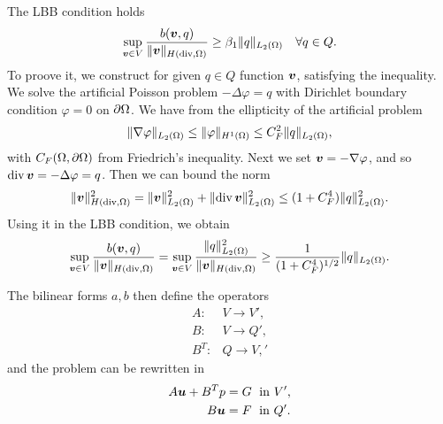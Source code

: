 The LBB condition holds
\begin{equation}
    \sup_{\mathbf{\boldsymbol{v}}\in V} \frac{b(\mathbf{\boldsymbol{v}},q)}{\| \mathbf{\boldsymbol{v}} \|_{H({\rm div},\Omega)}} \geq \beta_1\| q \|_{L_2(\Omega)} \quad \forall q\in Q.
\end{equation}
To proove it, we construct for given $q\in Q$ function $\mathbf{\boldsymbol{v}}$, satisfying the inequality.
We solve the artificial Poisson problem $-\Delta\varphi = q$ with Dirichlet boundary condition $\varphi = 0$ on $\partial\Omega$. We have from the ellipticity of the artificial problem
\begin{equation}
    \| \nabla\varphi \|_{L_2(\Omega)} \leq \| \varphi \|_{H^1(\Omega)}
        \leq C_F^2 \| q \|_{L_2(\Omega)},
\end{equation}
with $C_F(\Omega,\partial\Omega)$ from Friedrich's inequality. Next we set $\mathbf{\boldsymbol{v}} = -\nabla \varphi$, and so ${\rm div}\,\mathbf{\boldsymbol{v}} = -\Delta\varphi=q$. Then we can bound the norm
\begin{equation}
    \| \mathbf{\boldsymbol{v}} \|^2_{H({\rm div},\Omega)} = \| \mathbf{\boldsymbol{v}} \|^2_{L_2(\Omega)} 
        + \| {\rm div}\,\mathbf{\boldsymbol{v}} \|^2_{L_2(\Omega)}
        \leq (1+C_F^4) \| q \|^2_{L_2(\Omega)}.
\end{equation}
Using it in the LBB condition, we obtain
\begin{equation}
    \sup_{\mathbf{\boldsymbol{v}}\in V} \frac{b(\mathbf{\boldsymbol{v}},q)}{\| \mathbf{\boldsymbol{v}} \|_{H({\rm div},\Omega)}} =
    \sup_{\mathbf{\boldsymbol{v}}\in V} \frac{\| q \|^2_{L_2(\Omega)}}{\| \mathbf{\boldsymbol{v}} \|_{H({\rm div},\Omega)}}
    \geq \frac{1}{(1+C_F^4)^{1/2}} \| q \|_{L_2(\Omega)}.
\end{equation}

The bilinear forms $a,b$ then define the operators
\begin{eqnarray}
A:& V \rightarrow V',\\ 
B:& V \rightarrow Q',\\
B^T:& Q \rightarrow V,'
\end{eqnarray}
and the problem can be rewritten in
\begin{align}
 A\mathbf{\boldsymbol{u}} + B^Tp &= G \;\textrm{  in } V', \label{eqn:saddle3} \\
 B\mathbf{\boldsymbol{u}} &= F  \;\textrm{  in } Q'. \label{eqn:saddle4}
\end{align}


